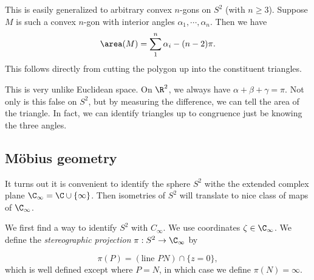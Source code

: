 \documentclass[a4paper]{article}
\begin{document}
This is easily generalized to arbitrary convex $n$-gons on $S^2$ (with $n \geq 3$). Suppose $M$ is such a convex $n$-gon with interior angles $\alpha_1, \cdots, \alpha_n$. Then we have
\[
  \area(M) = \sum_1^n \alpha_i - (n - 2) \pi.
\]
This follows directly from cutting the polygon up into the constituent triangles.

This is very unlike Euclidean space. On $\R^2$, we always have $\alpha + \beta + \gamma = \pi$. Not only is this false on $S^2$, but by measuring the difference, we can tell the area of the triangle. In fact, we can identify triangles up to congruence just be knowing the three angles.

\subsection{M\"obius geometry}
It turns out it is convenient to identify the sphere $S^2$ withe the extended complex plane $\C_\infty = \C \cup \{\infty\}$. Then isometries of $S^2$ will translate to nice class of maps of $\C_\infty$.

We first find a way to identify $S^2$ with $C_\infty$. We use coordinates $\zeta \in \C_\infty$. We define the \emph{stereographic projection} $\pi: S^2 \to \C_\infty$ by
\begin{center}
\end{center}
\[
  \pi(P) = (\text{line } PN)\cap \{z = 0\},
\]
which is well defined except where $P = N$, in which case we define $\pi(N) = \infty$.
\end{document}
